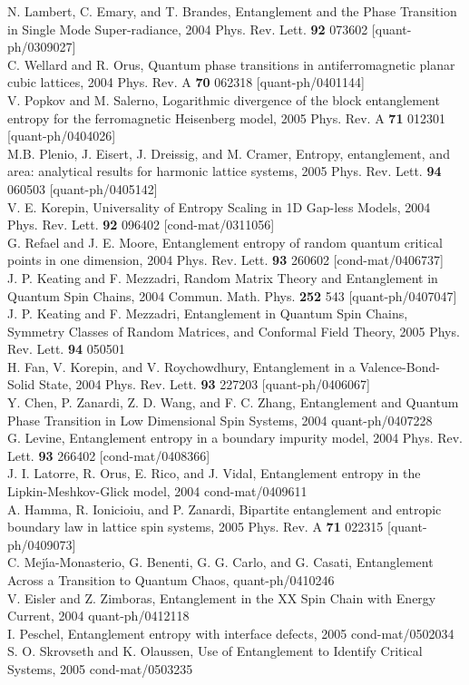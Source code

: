 {\begin{thebibliography}{99}
%
N. Lambert, C. Emary, and T. Brandes,
Entanglement and the Phase Transition in Single Mode Super-radiance,
2004 Phys. Rev. Lett. {\bf 92} 073602 [quant-ph/0309027]\\
C. Wellard and R. Orus, Quantum phase transitions in antiferromagnetic 
planar cubic lattices, 2004 Phys. Rev. A {\bf 70} 062318 [quant-ph/0401144]\\
V. Popkov and M. Salerno, Logarithmic divergence of the block entanglement 
entropy for the ferromagnetic Heisenberg model, 
2005 Phys. Rev. A {\bf 71} 012301 [quant-ph/0404026]\\
M.B. Plenio, J. Eisert, J. Dreissig, and M. Cramer, 
Entropy, entanglement, and area: analytical results for harmonic lattice 
systems, 2005 Phys. Rev. Lett. {\bf 94} 060503 [quant-ph/0405142]\\
V. E. Korepin, Universality of Entropy Scaling in 1D Gap-less Models,
2004 Phys. Rev. Lett. {\bf 92} 096402 [cond-mat/0311056]\\
G. Refael and  J. E. Moore, 
Entanglement entropy of random quantum critical points in one dimension,
2004 Phys. Rev. Lett. {\bf 93} 260602 [cond-mat/0406737]\\
J. P. Keating and F. Mezzadri,
Random Matrix Theory and Entanglement in Quantum Spin Chains,
2004 Commun. Math. Phys. {\bf 252} 543 [quant-ph/0407047]\\
J. P. Keating and F. Mezzadri,
Entanglement in Quantum Spin Chains, Symmetry Classes of Random Matrices, 
and Conformal Field Theory,
2005 Phys. Rev. Lett. {\bf 94} 050501\\
H. Fan, V. Korepin, and V. Roychowdhury,
Entanglement in a Valence-Bond-Solid State,
2004 Phys. Rev. Lett. {\bf 93} 227203 [quant-ph/0406067]\\
Y. Chen, P. Zanardi, Z. D. Wang, and F. C. Zhang,
Entanglement and Quantum Phase Transition in Low Dimensional Spin Systems,
2004 quant-ph/0407228\\
G. Levine, Entanglement entropy in a boundary impurity model,
2004 Phys. Rev. Lett. {\bf 93} 266402 [cond-mat/0408366]\\
J. I. Latorre, R. Orus, E. Rico, and J. Vidal,
Entanglement entropy in the Lipkin-Meshkov-Glick model,
2004 cond-mat/0409611\\
A. Hamma, R. Ionicioiu, and P. Zanardi,
Bipartite entanglement and entropic boundary law in lattice spin systems,
2005 Phys. Rev. A {\bf 71} 022315 [quant-ph/0409073]\\
C. Mej\'{\i}a-Monasterio, G. Benenti, G. G. Carlo, and G. Casati,
Entanglement Across a Transition to Quantum Chaos, quant-ph/0410246\\
V. Eisler and Z. Zimboras, 
Entanglement in the XX Spin Chain with Energy Current, 
2004 quant-ph/0412118\\
I. Peschel, Entanglement entropy with interface defects, 
2005 cond-mat/0502034\\
S. O. Skrovseth and K. Olaussen, 
Use of Entanglement to Identify Critical Systems, 2005 cond-mat/0503235


\end{thebibliography}}
